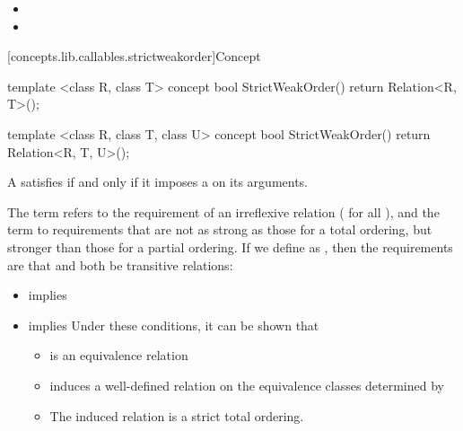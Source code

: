\begin{addedblock}
\begin{itemdescr}
\begin{itemize}
\item {}
\item {}
\end{itemize}
\end{itemdescr}

[concepts.lib.callables.strictweakorder]{Concept }

%
\begin{itemdecl}
template <class R, class T>
concept bool StrictWeakOrder() {
  return Relation<R, T>();
}

template <class R, class T, class U>
concept bool StrictWeakOrder() {
  return Relation<R, T, U>();
}
\end{itemdecl}

\begin{itemdescr}
\pnum
A  satisfies  if and only if
it imposes a  on its arguments.


{\color{black}
\pnum
The term
refers to the
requirement of an irreflexive relation ( for all ),
and the term
to requirements that are not as strong as
those for a total ordering,
but stronger than those for a partial
ordering.
If we define
as
,
then the requirements are that
and
both be transitive  relations:

\begin{itemize}
\item
{}
implies
\item
{}
implies
\enternote
Under these conditions, it can be shown that
\begin{itemize}
\item
{}
is an equivalence relation
\item
{}
induces a well-defined relation on the equivalence
classes determined by
\item
The induced relation is a strict total ordering.
\exitnote
\end{itemize}
\end{itemize}
}
\end{itemdescr}
\end{addedblock}
